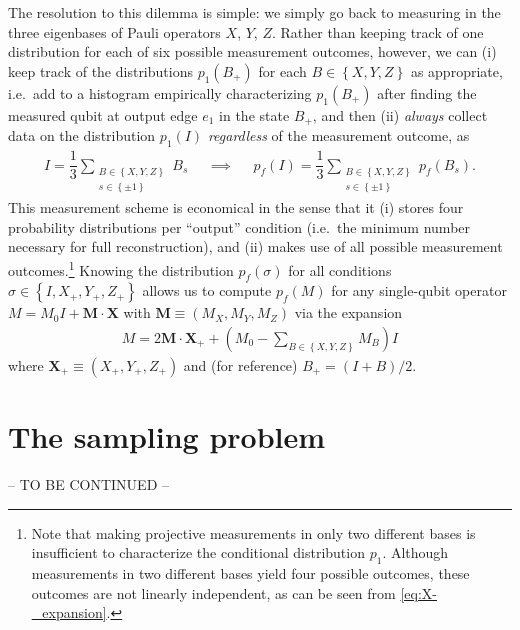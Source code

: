 \documentclass[nofootinbib,notitlepage,11pt]{revtex4-2}
\newcommand{\f}[2]{\dfrac{#1}{#2}} %
\newcommand{\p}[1]{\left(#1\right)} %
\renewcommand{\set}[1]{\left\{#1\right\}} %
\renewcommand{\v}{\bm} %
\renewcommand{\c}{\cdot} %
\begin{document}
The resolution to this dilemma is simple: we simply go back to
measuring in the three eigenbases of Pauli operators $X$, $Y$, $Z$.
Rather than keeping track of one distribution for each of six possible
measurement outcomes, however, we can (i) keep track of the
distributions $p_1\p{B_+}$ for each $B\in\set{X,Y,Z}$ as appropriate,
i.e.~add to a histogram empirically characterizing $p_1\p{B_+}$ after
finding the measured qubit at output edge $e_1$ in the state $B_+$,
and then (ii) {\it always} collect data on the distribution $p_1\p{I}$
{\it regardless} of the measurement outcome, as
\begin{align}
  I = \f13 \sum_{\substack{B\in\set{X,Y,Z}\\s\in\set{\pm1}}} B_s
  &&
  \implies
  &&
  p_f\p{I} = \f13 \sum_{\substack{B\in\set{X,Y,Z}\\s\in\set{\pm1}}}
  p_f\p{B_s}.
\end{align}
This measurement scheme is economical in the sense that it (i) stores
four probability distributions per ``output'' condition (i.e.~the
minimum number necessary for full reconstruction), and (ii) makes use
of all possible measurement outcomes.\footnote{Note that making
  projective measurements in only two different bases is insufficient
  to characterize the conditional distribution $p_1$.  Although
  measurements in two different bases yield four possible outcomes,
  these outcomes are not linearly independent, as can be seen from
  \eqref{eq:X-_expansion}.}  Knowing the distribution $p_f\p{\sigma}$
for all conditions $\sigma\in\set{I,X_+,Y_+,Z_+}$ allows us to compute
$p_f\p{M}$ for any single-qubit operator $M = M_0 I + \v M\c\v X$ with
$\v M\equiv\p{M_X,M_Y,M_Z}$ via the expansion
\begin{align}
  M = 2 \v M\c\v X_+ + \p{ M_0 - \sum_{B\in\set{X,Y,Z}} M_B } I
\end{align}
where $\v X_+\equiv\p{X_+,Y_+,Z_+}$ and (for reference)
$B_+=\p{I+B}/2$.


\section{The sampling problem}
\label{sec:sampling}

-- TO BE CONTINUED --



\end{document}
